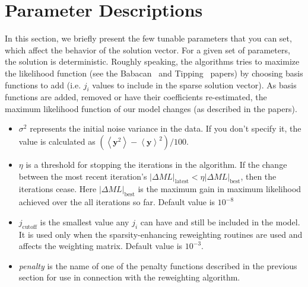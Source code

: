 \documentclass[paper=a4, fontsize=11pt]{scrartcl} %
\numberwithin{equation}{section} %
\numberwithin{figure}{section} %
\numberwithin{table}{section} %
\begin{document}
\section{Parameter Descriptions}

In this section, we briefly present the few tunable parameters that
you can set, which affect the behavior of the solution
vector. For a given set of parameters, the solution is deterministic.
Roughly speaking, the algorithms tries to maximize the likelihood
function (see the Babacan~\cite{Babacan:2010dt} and
Tipping~\cite{Tipping:hutXJNEK} papers) by choosing basis
functions to add (i.e. $j_i$ values to include in the sparse solution
vector). As basis functions are added, removed or have their
coefficients re-estimated, the maximum likelihood function of our
model changes (as described in the papers).

\begin{itemize}
\item $\sigma^2$ represents the initial noise variance in the data. If
  you don't specify it, the value is calculated as $\left( \left<
    \mathbf{y}^2 \right>-\left< \mathbf{y} \right>^2 \right)/100$.
\item $\eta$ is a threshold for stopping the iterations in the
  algorithm.  If the change between the most recent iteration's
  $|\Delta ML|_{\textrm{latest}} < \eta |\Delta ML|_{\textrm{best}}$,
  then the iterations cease. Here $|\Delta ML|_{\textrm{best}}$ is the
  maximum gain in maximum likelihood achieved over the all iterations
  so far. Default value is $10^{-8}$
\item $j_{\textrm{cutoff}}$ is the smallest value any $j_i$ can have
  and still be included in the model. It is used only when the
  sparsity-enhancing reweighting routines are used and affects the
  weighting matrix. Default value is $10^{-3}$.
\item \emph{penalty} is the name of one of the penalty functions
  described in the previous section for use in connection with the
  reweighting algorithm.
\end{itemize}


\end{document}

